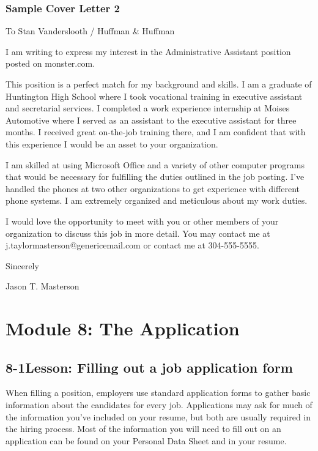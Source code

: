 \pagebreak\subsubsection*{Sample Cover Letter 2}
To Stan Vanderslooth / Huffman \& Huffman

I am writing to express my interest in the Administrative Assistant position posted on monster.com.

This position is a perfect match for my background and skills. I am a graduate of Huntington High School where I took vocational training in executive assistant and secretarial services. I completed a work experience internship at Moises Automotive where I served as an assistant to the executive assistant for three months. I received great on-the-job training there, and I am confident that with this experience I would be an asset to your organization.

I am skilled at using Microsoft Office and a variety of other computer programs that would be necessary for fulfilling the duties outlined in the job posting. I've handled the phones at two other organizations to get experience with different phone systems. I am extremely organized and meticulous about my work duties.

I would love the opportunity to meet with you or other members of your organization to discuss this job in more detail. You may contact me at j.taylormasterson@genericemail.com or contact me at 304-555-5555.

Sincerely

Jason T. Masterson

\pagebreak \section*{Module 8: The Application}
\noindent\makebox[\textwidth]{\rule{\linewidth}{0.4pt}}  \localtableofcontents
\noindent\makebox[\textwidth]{\rule{\linewidth}{0.4pt}}


\pagebreak \subsection*{8-1\quad Lesson: Filling out a job application form}
When filling a position, employers use standard application forms to gather basic information about the candidates for every job. Applications may ask for much of the information you've included on your resume, but both are usually required in the hiring process. Most of the information you will need to fill out on an application can be found on your Personal Data Sheet and in your resume.

